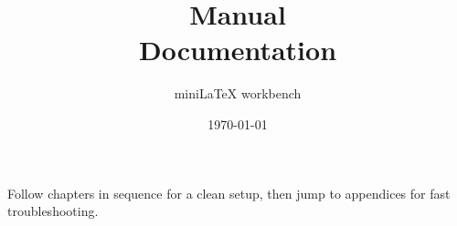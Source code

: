 \documentclass[11pt,a4paper,openright,twoside]{book}
\title{Manual\\\large Documentation}
\author{miniLaTeX workbench}
\date{\today}
\begin{document}
\dominitoc
\maketitle
\tableofcontents

\begin{tcolorbox}[modernnote,title=How to read this guide]
Follow chapters in sequence for a clean setup, then jump to appendices for fast troubleshooting.
\end{tcolorbox}




\end{document}

